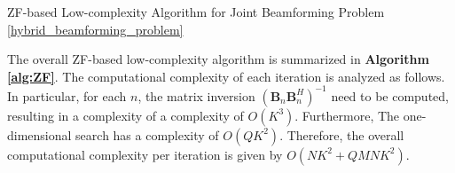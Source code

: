 \begin{algorithm}[tb]
    \caption{ZF-based Low-complexity Algorithm for Joint Beamforming Problem \eqref{hybrid_beamforming_problem}}
    \label{alg:ZF}
    \begin{algorithmic}[1]
        \REPEAT
            \ENDFOR
    \end{algorithmic}
\end{algorithm}

The overall ZF-based low-complexity algorithm is summarized in \textbf{Algorithm \ref{alg:ZF}}. The computational complexity of each iteration is analyzed as follows. In particular, for each $n$, the matrix inversion $\left(\mathbf{B}_n \mathbf{B}_n^H\right)^{-1}$ need to be computed, resulting in a complexity of a complexity of $O(K^3)$. Furthermore, The one-dimensional search has a complexity of $O(Q K^2)$. Therefore, the overall computational complexity per iteration is given by $O(N K^2 + Q MN K^2)$.  

